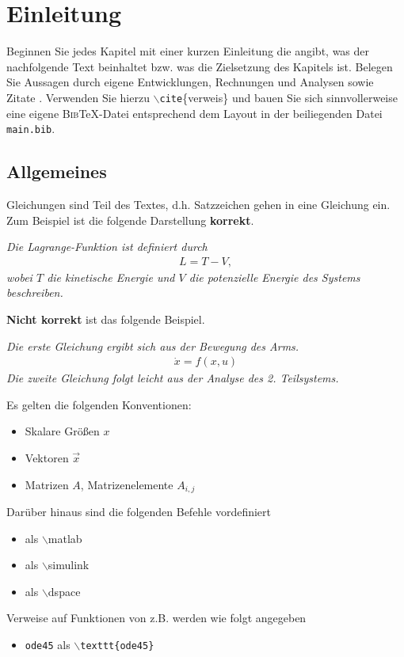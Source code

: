 %
\chapter{Einleitung}
%
Beginnen Sie jedes Kapitel mit einer kurzen Einleitung die angibt, was
der nachfolgende Text beinhaltet bzw. was die Zielsetzung des Kapitels
ist. Belegen Sie Aussagen durch eigene Entwicklungen, Rechnungen und
Analysen sowie Zitate \cite{NeuronalDynamics}. Verwenden Sie
hierzu $\backslash$\texttt{cite}\{verweis\} und bauen Sie sich
sinnvollerweise eine eigene \textsc{Bib}\TeX-Datei entsprechend dem
Layout in der beiliegenden Datei \texttt{main.bib}.
%
\section{Allgemeines}
%
\begin{remark}
  Gleichungen sind Teil des Textes, d.h. Satzzeichen gehen in eine
  Gleichung ein. Zum Beispiel ist die folgende Darstellung
  \textbf{korrekt}.  

  \noindent\textit{Die Lagrange-Funktion ist definiert durch 
  \begin{align}
    L=T-V,
  \end{align}
  wobei $T$ die kinetische Energie und $V$ die potenzielle Energie des
  Systems beschreiben.}

  \noindent \textbf{Nicht korrekt} ist das folgende Beispiel.

  \noindent\textit{Die erste Gleichung ergibt sich aus der Bewegung des Arms.
  \begin{align}
    \dot{x} = f(x,u)
  \end{align}
  Die zweite Gleichung folgt leicht aus der Analyse des
  2. Teilsystems.}

\end{remark}

\begin{remark}
  Es gelten die folgenden Konventionen:
  \begin{itemize}
  \item Skalare Größen $x$
  \item Vektoren $\vec{x}$
  \item Matrizen $A$, Matrizenelemente $A_{i,j}$
  \end{itemize}
  Darüber hinaus sind die folgenden Befehle vordefiniert
  \begin{itemize}
  \item \matlab als $\backslash$\textsf{matlab} 
  \item \simulink als $\backslash$\textsf{simulink}
  \item \dspace als $\backslash$\textsf{dspace}
  \end{itemize}
  Verweise auf Funktionen von z.B. \matlab werden wie folgt angegeben
  \begin{itemize}
  \item \texttt{ode45} als $\backslash$\texttt{texttt\{ode45\}}
  \end{itemize}
\end{remark}
%
%
